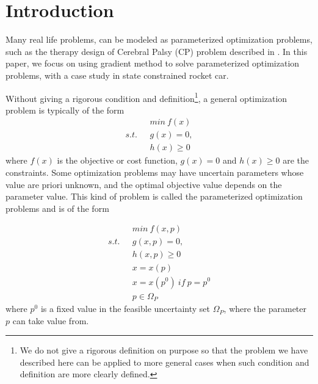 \documentclass  [
  paper    = a4,
  BCOR     = 10mm,
  twoside,
  fontsize = 12pt,
  fleqn,
  toc      = bibnumbered,
  toc      = listofnumbered,
  numbers  = noendperiod,
  headings = normal,
  listof   = leveldown,
  version  = 3.03
]                                       {scrreprt}
\newcommand{\<}{\langle}
\renewcommand{\>}{\rangle}
\begin{document}
   
   \tableofcontents
    \let\clearpage\relax
   \newpage
   
   
   \chapter{Introduction}
   
   Many real life problems, can be modeled as parameterized optimization problems, such as the therapy design of Cerebral Palsy (CP) problem described in \cite{MatSch22}. In this paper, we focus on using gradient method to solve parameterized optimization problems, with a case study in state constrained rocket car. 
   
   Without giving a rigorous condition and definition\footnote{We do not give a rigorous definition on purpose so that the problem we have described here can be applied to more general cases when such condition and definition are more clearly defined.},  a general optimization problem is typically of the form
   \begin{equation}
   \begin{aligned}
   \  \  \ & min \  f(x) \\
   s.t.  \  \  \ & g(x) = 0, \\ 
   &  h(x)  \geq  0 
   \end{aligned}
   \label{GeneralMin}
   \end{equation}
   where $f(x)$ is the objective or cost function, $g(x) = 0$ and $h(x)  \geq  0$ are the constraints. Some optimization problems may have uncertain parameters whose value are priori unknown, and the optimal objective value depends on the parameter value. This kind of problem is called the parameterized optimization problems and is of the form 
   
   
   \begin{equation}
   \begin{aligned}
   \  \  \ & min \  f(x, p) \\
   s.t.  \  \  \ & g(x, p) = 0, \\ 
   &  h(x,p)  \geq  0  \\ 
   & x = x(p) \\
   & x = x(p^0) \  if \  p = p^0 \\
   & p \in \Omega_P		
   \end{aligned}
   \label{ParaMin}
   \end{equation}
   where $p^0$ is a fixed value in the feasible uncertainty set $\Omega_P$, where the parameter $p$ can take value from.
   
\end{document}
